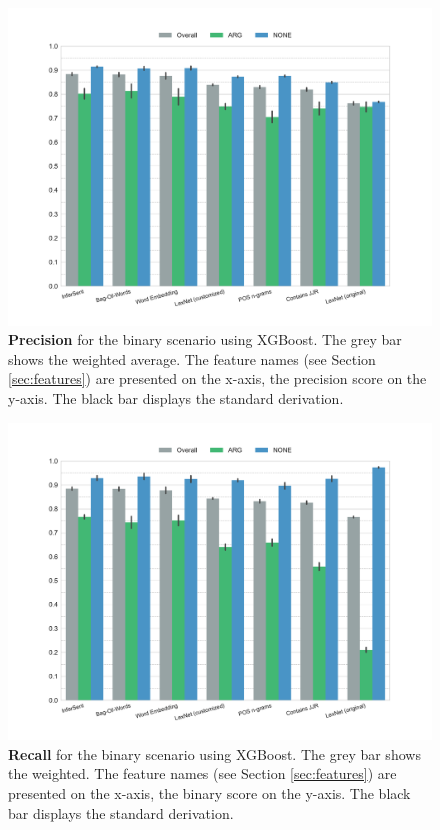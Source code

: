 \begin{figure}[p]
         \caption{\textbf{Precision} for the binary scenario using XGBoost. The grey bar shows the weighted average. The feature names (see Section \ref{sec:features}) are presented on the x-axis, the precision score on the y-axis. The black bar displays the standard derivation.} 
    \label{fig:2_precision}
    \centering
	\includegraphics[width=0.9\linewidth]{images/experiments/precision-True}
    \end{figure}
    \begin{figure}[p]
              \caption{\textbf{Recall} for the binary scenario using XGBoost. The grey bar shows the weighted. The feature names (see Section \ref{sec:features}) are presented on the x-axis, the binary score on the y-axis. The black bar displays the standard derivation.} 
       \label{fig:2_recall}
 \centering
	\includegraphics[width=0.9\linewidth]{images/experiments/recall-True}

\end{figure}



